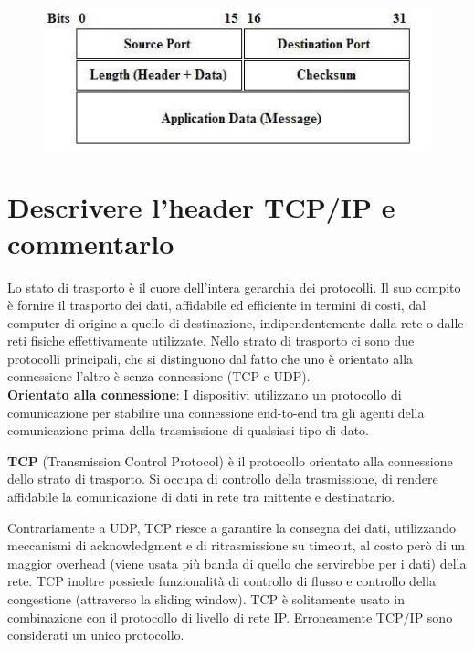 \begin{figure}[H]
\centering
\includegraphics[scale=0.8]{res/img/48_HeaderUDP.png}
\end{figure}
 
\section{Descrivere l’header TCP/IP e commentarlo}
Lo stato di trasporto è il cuore dell’intera gerarchia dei protocolli. Il suo compito è fornire il trasporto dei dati, affidabile ed efficiente in termini di costi, dal computer di origine a quello di destinazione, indipendentemente dalla rete o dalle reti fisiche effettivamente utilizzate.
Nello strato di trasporto ci sono due protocolli principali, che si distinguono dal fatto che uno è orientato alla connessione l’altro è senza connessione (TCP e UDP).\\
\textbf{Orientato alla connessione}: I dispositivi utilizzano un protocollo di comunicazione per stabilire una connessione end-to-end tra gli agenti della comunicazione prima della trasmissione di qualsiasi tipo di dato.

\textbf{TCP} (Transmission Control Protocol) è il protocollo orientato alla connessione dello strato di trasporto. Si occupa di controllo della trasmissione, di rendere affidabile la comunicazione di dati in rete tra mittente e destinatario.

Contrariamente a UDP, TCP riesce a garantire la consegna dei dati, utilizzando meccanismi di acknowledgment e di ritrasmissione su timeout, al costo però di un maggior overhead (viene usata più banda di quello che servirebbe per i dati) della rete.
TCP inoltre possiede funzionalità di controllo di flusso e controllo della congestione (attraverso la sliding window).
TCP è solitamente usato in combinazione con il protocollo di livello di rete IP. Erroneamente TCP/IP sono considerati un unico protocollo.

